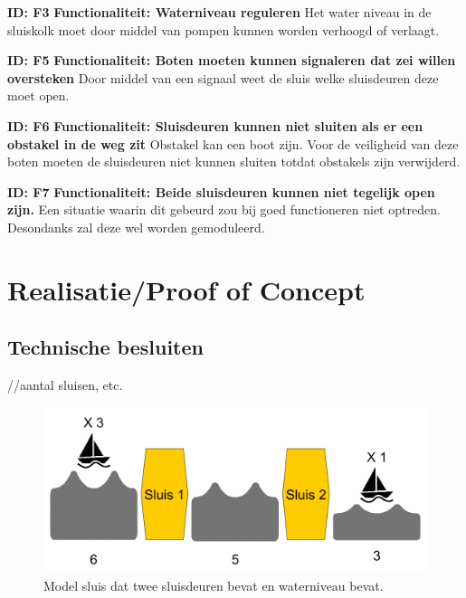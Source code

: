 \documentclass{article}
\begin{document}
\textbf{ID: F3} \newline
\textbf{Functionaliteit: Waterniveau reguleren} \newline
Het water niveau in de sluiskolk moet door middel van pompen kunnen worden verhoogd of verlaagt. \newline

\textbf{ID: F5} \newline
\textbf{Functionaliteit: Boten moeten kunnen signaleren dat zei willen oversteken} \newline
Door middel van een signaal weet de sluis welke sluisdeuren deze moet open. \newline

\textbf{ID: F6} \newline
\textbf{Functionaliteit: Sluisdeuren kunnen niet sluiten als er een obstakel in de weg zit} \newline
Obstakel kan een boot zijn. Voor de veiligheid van deze boten moeten de sluisdeuren niet kunnen sluiten totdat obstakels zijn verwijderd.  \newline

\textbf{ID: F7} \newline
\textbf{Functionaliteit: Beide sluisdeuren kunnen niet tegelijk open zijn.} \newline
Een situatie waarin dit gebeurd zou bij goed functioneren niet optreden. Desondanks zal deze wel worden gemoduleerd. \newline


\section{Realisatie/Proof of Concept}

\subsection{Technische besluiten}
//aantal sluisen, etc.
\begin{figure}[!h]
	\centering
	\includegraphics[width=\textwidth]{images/sluis_model.png}
    \caption{Model sluis dat twee sluisdeuren bevat en waterniveau bevat.}
\end{figure}
\end{document}
